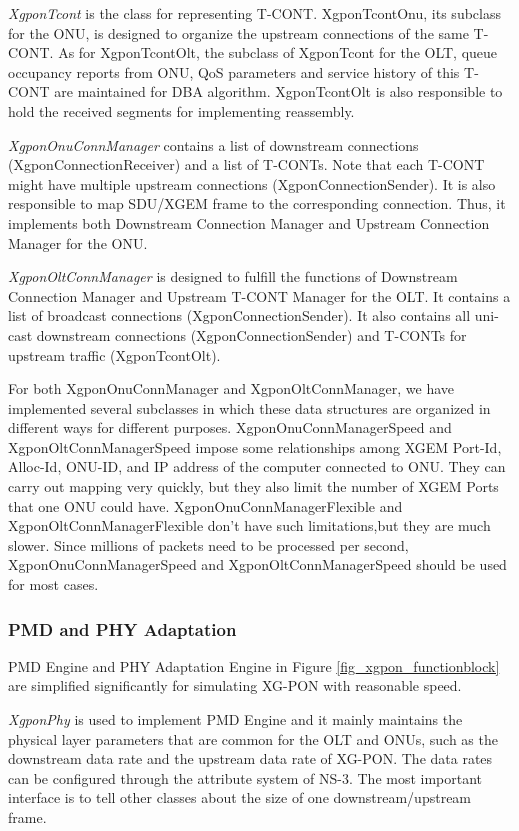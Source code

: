 \emph{XgponTcont} is the class for representing T-CONT.
XgponTcontOnu, its subclass for the ONU, is designed to organize
the upstream connections of the same T-CONT. As for XgponTcontOlt,
the subclass of XgponTcont for the OLT, queue occupancy reports
from ONU, QoS parameters and service history of this T-CONT are
maintained for DBA algorithm. XgponTcontOlt is also responsible to
hold the received segments for implementing reassembly.

\emph{XgponOnuConnManager} contains a list of downstream
connections (XgponConnectionReceiver) and a list of T-CONTs. Note
that each T-CONT might have multiple upstream connections
(XgponConnectionSender). It is also responsible to map SDU/XGEM
frame to the corresponding connection. Thus, it implements both
Downstream Connection Manager and Upstream Connection Manager for
the ONU.

\emph{XgponOltConnManager} is designed to fulfill the functions of
Downstream Connection Manager and Upstream T-CONT Manager for the
OLT. It contains a list of broadcast connections
(XgponConnectionSender). It also contains all uni-cast downstream
connections (XgponConnectionSender) and T-CONTs for upstream
traffic (XgponTcontOlt).

For both XgponOnuConnManager and XgponOltConnManager, we have
implemented several subclasses in which these data structures are
organized in different ways for different purposes.
XgponOnuConnManagerSpeed and XgponOltConnManagerSpeed impose some
relationships among XGEM Port-Id, Alloc-Id, ONU-ID, and IP address
of the computer connected to ONU. They can carry out mapping very
quickly, but they also limit the number of XGEM Ports that one ONU
could have. XgponOnuConnManagerFlexible and
XgponOltConnManagerFlexible don't have such limitations,but they
are much slower. Since millions of packets need to be processed
per second, XgponOnuConnManagerSpeed and XgponOltConnManagerSpeed
should be used for most cases.



\subsubsection{PMD and PHY Adaptation}

PMD Engine and PHY Adaptation Engine in Figure
\ref{fig_xgpon_functionblock} are simplified significantly for
simulating XG-PON with reasonable speed.

\emph{XgponPhy} is used to implement PMD Engine and it mainly
maintains the physical layer parameters that are common for the
OLT and ONUs, such as the downstream data rate and the upstream
data rate of XG-PON. The data rates can be configured through the
attribute system of NS-3. The most important interface is to
tell other classes about the size of one downstream/upstream frame.

